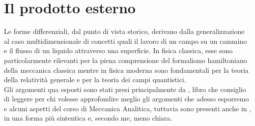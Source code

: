 \chapter{Il prodotto esterno}
\pagestyle{plain}
\thispagestyle{empty}
\pagestyle{fancy}
Le forme differenziali, dal punto di vista storico, derivano dalla generalizzazione al caso multidimensionale di concetti
quali il lavoro di un campo su un cammino e il flusso di un liquido attraverso una superficie. In fisica classica, esse sono particolarmente
rilevanti per la piena comprensione del formalismo hamiltoniano della meccanica classica mentre in fisica moderna sono fondamentali per la
teoria della relatività generale e per la teoria dei campi quantistici. \\
Gli argomenti qua esposti sono stati presi principalmente da \cite{arnold}, libro che consiglio di leggere per chi volesse approfondire meglio gli argomenti che adesso esporremo e alcuni aspetti del corso di Meccanica Analitica, tuttavia sono presenti anche in \cite{rudin}, in una forma più sintentica e, secondo me, meno chiara.
%
\vspace{0.5cm}

